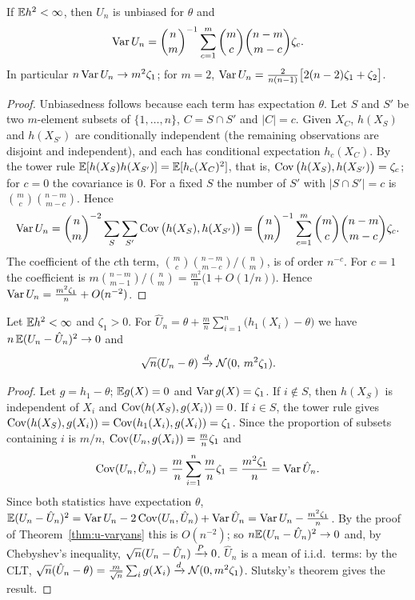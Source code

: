 \documentclass[main.tex]{subfiles}
\begin{document}
\begin{theorem}\label{thm:u-varyans}
If $\mathbb{E} h^2<\infty$, then $U_n$ is unbiased for $\theta$ and
\[
\operatorname{Var} U_n=\binom nm^{-1}\sum_{c=1}^m\binom mc\binom{n-m}{m-c}\zeta_c .
\]
In particular $n\operatorname{Var} U_n\to m^2\zeta_1$; for $m=2$, $\operatorname{Var} U_n=\frac{2}{n(n-1)}\big[2(n-2)\zeta_1+\zeta_2\big]$.
\end{theorem}
\begin{proof}
Unbiasedness follows because each term has expectation $\theta$. Let $S$ and $S'$ be two $m$-element subsets of $\{1,\dots,n\}$, $C=S\cap S'$ and $|C|=c$. Given $X_C$, $h(X_S)$ and $h(X_{S'})$ are conditionally independent (the remaining observations are disjoint and independent), and each has conditional expectation $h_c(X_C)$. By the tower rule $\mathbb{E}[h(X_S)h(X_{S'})]=\mathbb{E}[h_c(X_C)^2]$, that is, $\operatorname{Cov}\big(h(X_S),h(X_{S'})\big)=\zeta_c$; for $c=0$ the covariance is $0$. For a fixed $S$ the number of $S'$ with $|S\cap S'|=c$ is $\binom mc\binom{n-m}{m-c}$. Hence
\[
\operatorname{Var} U_n=\binom nm^{-2}\sum_S\sum_{S'}\operatorname{Cov}\big(h(X_S),h(X_{S'})\big)=\binom nm^{-1}\sum_{c=1}^m\binom mc\binom{n-m}{m-c}\zeta_c .
\]
The coefficient of the $c$th term, $\binom mc\binom{n-m}{m-c}/\binom nm$, is of order $n^{-c}$. For $c=1$ the coefficient is $m\binom{n-m}{m-1}/\binom nm=\frac{m^2}{n}\big(1+O(1/n)\big)$. Hence $\operatorname{Var} U_n=\frac{m^2\zeta_1}{n}+O(n^{-2})$.
\end{proof}

\begin{theorem}\label{thm:u-an}
Let $\mathbb{E} h^2<\infty$ and $\zeta_1>0$. For $\hat U_n=\theta+\frac mn\sum_{i=1}^n\big(h_1(X_i)-\theta\big)$ we have $n\,\mathbb{E}(U_n-\hat U_n)^2\to0$ and
\[
\sqrt n(U_n-\theta)\xrightarrow{d}\mathcal{N}(0,\,m^2\zeta_1).
\]
\end{theorem}
\begin{proof}
Let $g=h_1-\theta$; $\mathbb{E} g(X)=0$ and $\operatorname{Var} g(X)=\zeta_1$. If $i\notin S$, then $h(X_S)$ is independent of $X_i$ and $\operatorname{Cov}(h(X_S),g(X_i))=0$. If $i\in S$, the tower rule gives $\operatorname{Cov}(h(X_S),g(X_i))=\operatorname{Cov}(h_1(X_i),g(X_i))=\zeta_1$. Since the proportion of subsets containing $i$ is $m/n$, $\operatorname{Cov}(U_n,g(X_i))=\frac mn\zeta_1$ and
\[
\operatorname{Cov}(U_n,\hat U_n)=\frac mn\sum_{i=1}^n\frac mn\zeta_1=\frac{m^2\zeta_1}n=\operatorname{Var}\hat U_n .
\]
Since both statistics have expectation $\theta$, $\mathbb{E}(U_n-\hat U_n)^2=\operatorname{Var} U_n-2\operatorname{Cov}(U_n,\hat U_n)+\operatorname{Var}\hat U_n=\operatorname{Var} U_n-\frac{m^2\zeta_1}{n}$. By the proof of Theorem~\ref{thm:u-varyans} this is $O(n^{-2})$; so $n\mathbb{E}(U_n-\hat U_n)^2\to0$ and, by Chebyshev's inequality, $\sqrt n(U_n-\hat U_n)\xrightarrow{P}0$. $\hat U_n$ is a mean of i.i.d.\ terms: by the CLT, $\sqrt n(\hat U_n-\theta)=\frac{m}{\sqrt n}\sum_ig(X_i)\xrightarrow{d}\mathcal{N}(0,m^2\zeta_1)$. Slutsky's theorem gives the result.
\end{proof}
\end{document}
